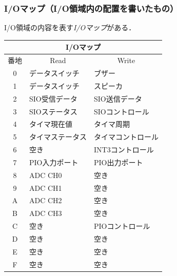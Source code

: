 \documentclass[handout]{beamer}        %
\begin{document}
\begin{frame}
  \frametitle{I/Oマップ（I/O領域内の配置を書いたもの）}
  I/O領域の内容を表す\emph{I/Oマップ}がある．
  \vfill
    \footnotesize\begin{tabular}{| c | l | l |}
    \hline
    \multicolumn{3}{|c|}{I/Oマップ} \\
    \hline
    番地 & \multicolumn{1}{|c|}{Read} & \multicolumn{1}{|c|}{Write} \\
    \hline
    0 & データスイッチ   & ブザー \\
    1 & データスイッチ   & スピーカ \\
    2 & SIO受信データ    & SIO送信データ \\
    3 & SIOステータス    & SIOコントロール \\
    4 & タイマ現在値     & タイマ周期 \\
    5 & タイマステータス & タイマコントロール \\
    6 & 空き             & INT3コントロール \\
    7 & PIO入力ポート    & PIO出力ポート \\
    8 & ADC CH0          & 空き \\
    9 & ADC CH1          & 空き \\
    A & ADC CH2          & 空き \\
    B & ADC CH3          & 空き \\
    C & 空き             & PIOコントロール \\
    D & 空き             & 空き \\
    E & 空き             & 空き \\
    F & 空き             & 空き \\
    \hline
    \end{tabular}
  \vfill
  \vfill
\end{frame}
\end{document}
